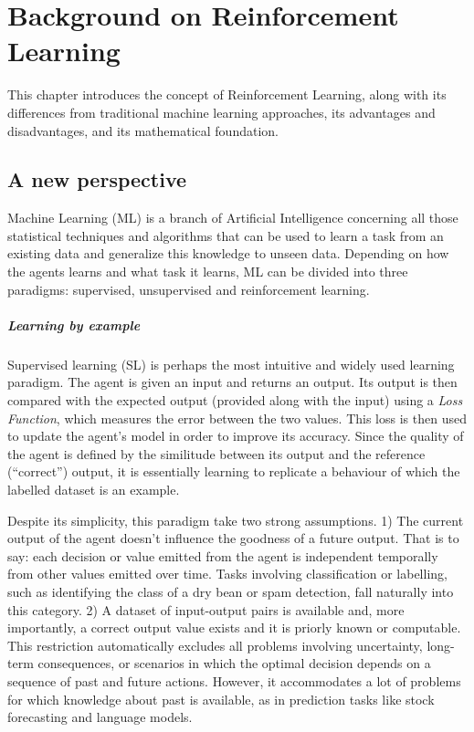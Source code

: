 \chapter{Background on Reinforcement Learning}
\label{chapter:reinforcement-learning}

This chapter introduces the concept of Reinforcement Learning, along with its differences from traditional machine learning approaches, its advantages and disadvantages, and its mathematical foundation.

\section{A new perspective}

Machine Learning (ML) is a branch of Artificial Intelligence concerning all those statistical techniques and algorithms that can be used to learn a task from an existing data and generalize this knowledge to unseen data. Depending on how the agents learns and what task it learns, ML can be divided into three paradigms: supervised, unsupervised and reinforcement learning.

\paragraph{Learning by example}

Supervised learning (SL) is perhaps the most intuitive and widely used learning paradigm.
The agent is given an input and returns an output. Its output is then compared with the expected output (provided along with the input) using a \textit{Loss Function}, which measures the error between the two values.
This loss is then used to update the agent's model in order to improve its accuracy.
Since the quality of the agent is defined by the similitude between its output and the reference (``correct'') output, it is essentially learning to replicate a behaviour of which the labelled dataset is an example.

Despite its simplicity, this paradigm take two strong assumptions.
1) The current output of the agent doesn't influence the goodness of a future output. That is to say: each decision or value emitted from the agent is independent temporally from other values emitted over time.
Tasks involving classification or labelling, such as identifying the class of a dry bean or spam detection, fall naturally into this category.
2) A dataset of input-output pairs is available and, more importantly, a correct output value exists and it is priorly known or computable. This restriction automatically excludes all problems involving uncertainty, long-term consequences, or scenarios in which the optimal decision depends on a sequence of past and future actions. However, it accommodates a lot of problems for which knowledge about past is available, as in prediction tasks like stock forecasting and language models.

